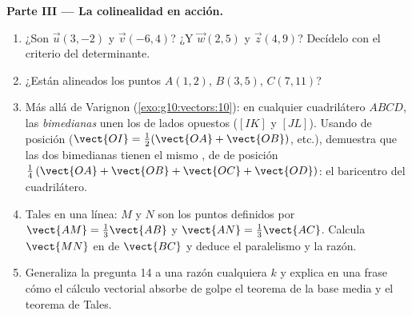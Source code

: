 \begin{problem}
\medskip
\noindent\textbf{Parte III --- La colinealidad en acción.}
\begin{enumerate}[resume]
  \item ¿Son  $\vec u(3, -2)$ y $\vec v(-6, 4)$? ¿Y
        $\vec w(2, 5)$ y $\vec z(4, 9)$? Decídelo con el criterio del
        determinante.
  \item ¿Están alineados los puntos $A(1, 2)$, $B(3, 5)$, $C(7, 11)$?
  \item Más allá de Varignon (\cref{exo:g10:vectors:10}): en cualquier
        cuadrilátero $ABCD$, las \emph{bimedianas} unen los 
        de lados opuestos ($[IK]$ y $[JL]$). Usando  de posición
        ($\vect{OI} = \frac12(\vect{OA} + \vect{OB})$, etc.), demuestra
        que las dos bimedianas tienen el mismo , de  de
        posición $\frac14\left(\vect{OA} + \vect{OB} + \vect{OC} +
        \vect{OD}\right)$: el baricentro del cuadrilátero.
  \item Tales en una línea: $M$ y $N$ son los puntos definidos por
        $\vect{AM} = \frac13\vect{AB}$ y $\vect{AN} = \frac13\vect{AC}$.
        Calcula $\vect{MN}$ en  de $\vect{BC}$ y deduce el
        paralelismo y la razón.
  \item Generaliza la pregunta 14 a una razón cualquiera $k$ y explica en
        una frase cómo el cálculo vectorial absorbe de golpe el teorema de
        la base media y el teorema de Tales.
\end{enumerate}


\end{problem}
